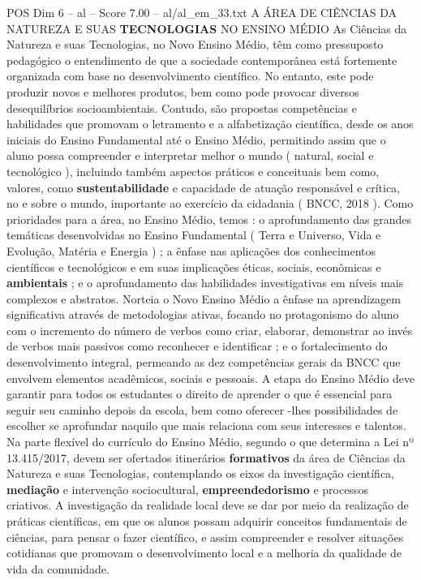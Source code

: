 \begin{textsample}{POS Dim 6 – al – Score 7.00 – al/al\_em\_33.txt}  \label{ex:f6_pos_228}
A ÁREA DE CIÊNCIAS DA NATUREZA E SUAS \textbf{TECNOLOGIAS} NO ENSINO MÉDIO As Ciências da Natureza e suas Tecnologias, no Novo Ensino Médio, têm como pressuposto pedagógico o entendimento de que a sociedade contemporânea está fortemente organizada com base no desenvolvimento científico.
No entanto, este pode produzir novos e melhores produtos, bem como pode provocar diversos desequilíbrios socioambientais.
Contudo, são propostas competências e habilidades que promovam o letramento e a alfabetização científica, desde os anos iniciais do Ensino Fundamental até o Ensino Médio, permitindo assim que o aluno possa compreender e interpretar melhor o mundo ( natural, social e tecnológico ), incluindo também aspectos práticos e conceituais bem como, valores, como \textbf{sustentabilidade} e capacidade de atuação responsável e crítica, no e sobre o mundo, importante ao exercício da cidadania ( BNCC, 2018 ).
Como prioridades para a área, no Ensino Médio, temos : o aprofundamento das grandes temáticas desenvolvidas no Ensino Fundamental ( Terra e Universo, Vida e Evolução, Matéria e Energia ) ; a ênfase nas aplicações dos conhecimentos científicos e tecnológicos e em suas implicações éticas, sociais, econômicas e \textbf{ambientais} ; e o aprofundamento das habilidades investigativas em níveis mais complexos e abstratos.
Norteia o Novo Ensino Médio a ênfase na aprendizagem significativa através de metodologias ativas, focando no protagonismo do aluno com o incremento do número de verbos como criar, elaborar, demonstrar ao invés de verbos mais passivos como reconhecer e identificar ; e o fortalecimento do desenvolvimento integral, permeando as dez competências gerais da BNCC que envolvem elementos acadêmicos, sociais e pessoais.
A etapa do Ensino Médio deve garantir para todos os estudantes o direito de aprender o que é essencial para seguir seu caminho depois da escola, bem como oferecer -lhes possibilidades de escolher se aprofundar naquilo que mais relaciona com seus interesses e talentos.
Na parte flexível do currículo do Ensino Médio, segundo o que determina a Lei nº 13.415/2017, devem ser ofertados itinerários \textbf{formativos} da área de Ciências da Natureza e suas Tecnologias, contemplando os eixos da investigação científica, \textbf{mediação} e intervenção sociocultural, \textbf{empreendedorismo} e processos criativos.
A investigação da realidade local deve se dar por meio da realização de práticas científicas, em que os alunos possam adquirir conceitos fundamentais de ciências, para pensar o fazer científico, e assim compreender e resolver situações cotidianas que promovam o desenvolvimento local e a melhoria da qualidade de vida da comunidade.

\end{textsample}
